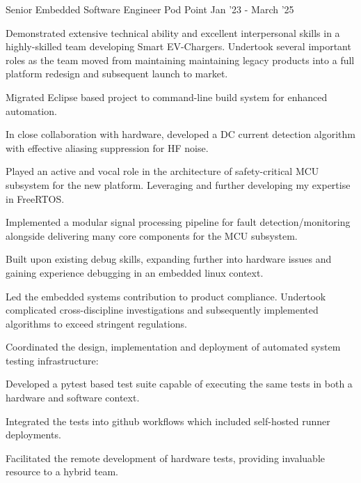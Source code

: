 

\begin{cventries}


  \cventry
    {Senior Embedded Software Engineer}
    {Pod Point}
    {}
    {Jan '23 - March '25}
    { 
      Demonstrated extensive technical ability and excellent interpersonal skills in a highly-skilled team developing Smart EV-Chargers. Undertook several important roles as the team moved from maintaining maintaining legacy products into a full platform redesign and subsequent launch to market.
      \begin{cvitems}
        \item{Migrated Eclipse based project to command-line build system for enhanced automation.}
        \item{In close collaboration with hardware, developed a DC current detection algorithm with effective aliasing suppression for HF noise.}
        \item{Played an active and vocal role in the architecture of safety-critical MCU subsystem for the new platform. Leveraging and further developing my expertise in FreeRTOS.}
        \item{Implemented a modular signal processing pipeline for fault detection/monitoring alongside delivering many core components for the MCU subsystem.}
        \item{Built upon existing debug skills, expanding further into hardware issues and gaining experience debugging in an embedded linux context.}
        \item{Led the embedded systems contribution to product compliance. Undertook complicated cross-discipline investigations and subsequently implemented algorithms to exceed stringent regulations.}
        \item{Coordinated the design, implementation and deployment of automated system testing infrastructure:}
        \begin{cvitems}
          \item{Developed a pytest based test suite capable of executing the same tests in both a hardware and software context.}
          \item{Integrated the tests into github workflows which included self-hosted runner deployments.}
          \item{Facilitated the remote development of hardware tests, providing invaluable resource to a hybrid team.}
        \end{cvitems}
      \end{cvitems}  
    }


\end{cventries}
